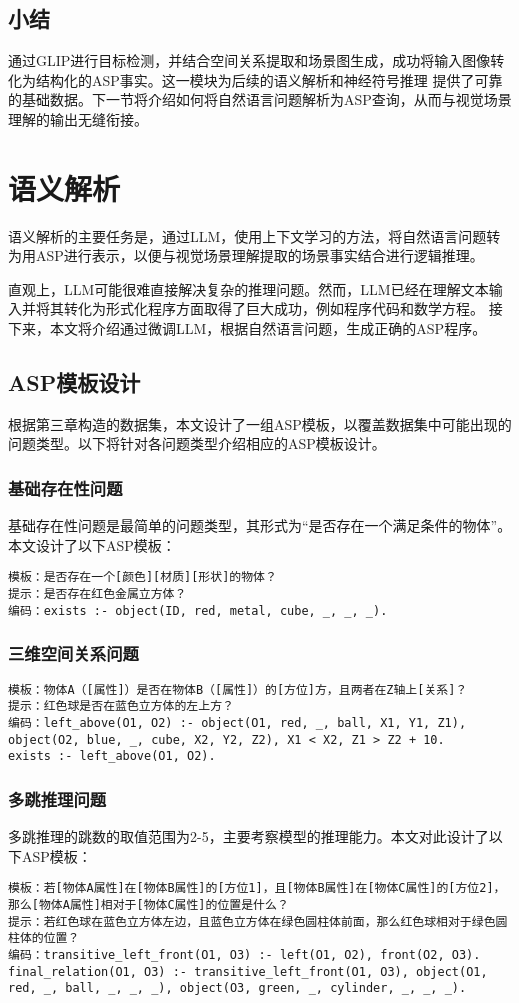 \subsection{小结}
通过GLIP进行目标检测，并结合空间关系提取和场景图生成，成功将输入图像转化为结构化的ASP事实。这一模块为后续的语义解析和神经符号推理
提供了可靠的基础数据。下一节将介绍如何将自然语言问题解析为ASP查询，从而与视觉场景理解的输出无缝衔接。
\section{语义解析}
语义解析的主要任务是，通过LLM，使用上下文学习的方法，将自然语言问题转为用ASP进行表示，以便与视觉场景理解提取的场景事实结合进行逻辑推理。

直观上，LLM可能很难直接解决复杂的推理问题。然而，LLM已经在理解文本输入并将其转化为形式化程序方面取得了巨大成功，例如程序代码\cite{gao2023pal}和数学方程\cite{he2023solving}。
接下来，本文将介绍通过微调LLM，根据自然语言问题，生成正确的ASP程序。

\subsection{ASP模板设计}
根据第三章构造的数据集，本文设计了一组ASP模板，以覆盖数据集中可能出现的问题类型。以下将针对各问题类型介绍相应的ASP模板设计。
\subsubsection{基础存在性问题}
基础存在性问题是最简单的问题类型，其形式为“是否存在一个满足条件的物体”。本文设计了以下ASP模板：
\begin{lstlisting}
模板：是否存在一个[颜色][材质][形状]的物体？
提示：是否存在红色金属立方体？
编码：exists :- object(ID, red, metal, cube, _, _, _).
\end{lstlisting}
\subsubsection{三维空间关系问题}
\begin{lstlisting}
模板：物体A（[属性]）是否在物体B（[属性]）的[方位]方，且两者在Z轴上[关系]？
提示：红色球是否在蓝色立方体的左上方？
编码：left_above(O1, O2) :- object(O1, red, _, ball, X1, Y1, Z1), object(O2, blue, _, cube, X2, Y2, Z2), X1 < X2, Z1 > Z2 + 10.
exists :- left_above(O1, O2).
\end{lstlisting}
\subsubsection{多跳推理问题}
多跳推理的跳数的取值范围为2-5，主要考察模型的推理能力。本文对此设计了以下ASP模板：
\begin{lstlisting}
模板：若[物体A属性]在[物体B属性]的[方位1]，且[物体B属性]在[物体C属性]的[方位2]，那么[物体A属性]相对于[物体C属性]的位置是什么？
提示：若红色球在蓝色立方体左边，且蓝色立方体在绿色圆柱体前面，那么红色球相对于绿色圆柱体的位置？
编码：transitive_left_front(O1, O3) :- left(O1, O2), front(O2, O3).
final_relation(O1, O3) :- transitive_left_front(O1, O3), object(O1, red, _, ball, _, _, _), object(O3, green, _, cylinder, _, _, _).
\end{lstlisting}
